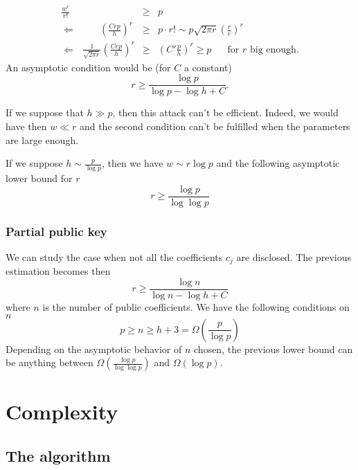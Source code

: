 \documentclass[a4paper]{article}
\begin{document}
\begin{eqnarray*}
\frac{w^r}{r!} &\geq& p \\
\Leftarrow \ \ \ \ \ \ \ \ \ \ \ \left(\frac{Crp}{h}\right)^r  &\geq& p \cdot r! \sim p \sqrt{2\pi r} \left(\frac{r}{e}\right)^r \\
\Leftarrow \ \ \ \frac{1}{\sqrt{2\pi r}} \left(\frac{Cep}{h}\right)^r &\geq& \left(C'\frac{p}{h}\right)^r \geq p \ \ \ \ \ \ \text{ for $r$ big enough.}
\end{eqnarray*}
An asymptotic condition would be (for $C$ a constant)
$$ r \geq \frac{\log p}{\log p - \log h + C} .$$

If we suppose that $h \gg p$, then this attack can't be efficient. Indeed, we would have then $w \ll r$ and the second condition can't be fulfilled when the parameters are large enough.

If we suppose $h \sim \frac{p}{\log p}$, then we have $w \sim r \log p$ and the following asymptotic lower bound for $r$
$$ r \geq \frac{\log p}{\log \log p}$$


\subsubsection{Partial public key}
We can study the case when not all the coefficients $c_j$ are disclosed. The previous estimation becomes then
$$ r \geq \frac{\log n}{\log n - \log h + C} $$
where $n$ is the number of public coefficients. We have the following conditions on $n$
$$ p \geq n \geq h+3 = \Omega\left(\frac{p}{\log p}\right)$$ 
Depending on the asymptotic behavior of $n$ chosen, the previous lower bound can be anything between $\Omega\left(\frac{\log p}{\log \log p}\right)$ and $\Omega(\log p)$.



\newpage
\section{Complexity}

\subsection{The algorithm}
\end{document}
